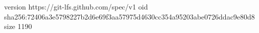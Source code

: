 version https://git-lfs.github.com/spec/v1
oid sha256:72406a3e5798227b2d6e69f3aa57975d4630cc354a95203abe0726ddac9e80d8
size 1190
